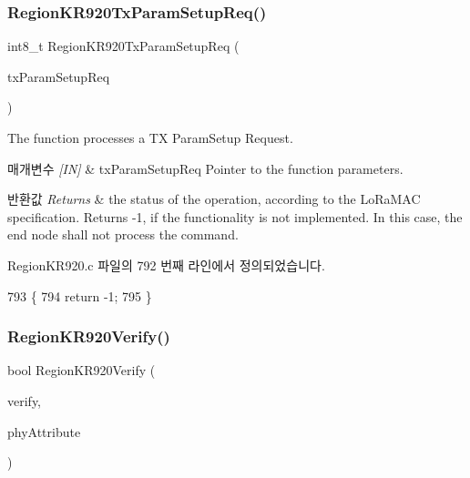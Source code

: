 \subsubsection{\texorpdfstring{Region\+K\+R920\+Tx\+Param\+Setup\+Req()}{RegionKR920TxParamSetupReq()}}
{\footnotesize\ttfamily int8\+\_\+t Region\+K\+R920\+Tx\+Param\+Setup\+Req (\begin{DoxyParamCaption}\item[{\mbox{\hyperlink{group___r_e_g_i_o_n_ga26836ef2996e70410e42ef471073f855}{Tx\+Param\+Setup\+Req\+Params\+\_\+t}} $\ast$}]{tx\+Param\+Setup\+Req }\end{DoxyParamCaption})}



The function processes a TX Param\+Setup Request. 


\begin{DoxyParams}{매개변수}
{\em \mbox{[}\+I\+N\mbox{]}} & tx\+Param\+Setup\+Req Pointer to the function parameters.\\
\hline
\end{DoxyParams}

\begin{DoxyRetVals}{반환값}
{\em Returns} & the status of the operation, according to the Lo\+Ra\+M\+AC specification. Returns -\/1, if the functionality is not implemented. In this case, the end node shall not process the command. \\
\hline
\end{DoxyRetVals}


Region\+K\+R920.\+c 파일의 792 번째 라인에서 정의되었습니다.


\begin{DoxyCode}
793 \{
794     \textcolor{keywordflow}{return} -1;
795 \}
\end{DoxyCode}
\mbox{\label{group___r_e_g_i_o_n_k_r920_ga8d91d301043467b48a4ae7f86800a48d}} 
\subsubsection{\texorpdfstring{Region\+K\+R920\+Verify()}{RegionKR920Verify()}}
{\footnotesize\ttfamily bool Region\+K\+R920\+Verify (\begin{DoxyParamCaption}\item[{\mbox{\hyperlink{group___r_e_g_i_o_n_ga966d97bc2f25df1c09e92e60ef652276}{Verify\+Params\+\_\+t}} $\ast$}]{verify,  }\item[{\mbox{\hyperlink{group___r_e_g_i_o_n_ga9445b07fdf77581ecfaf389970e635f8}{Phy\+Attribute\+\_\+t}}}]{phy\+Attribute }\end{DoxyParamCaption})}



